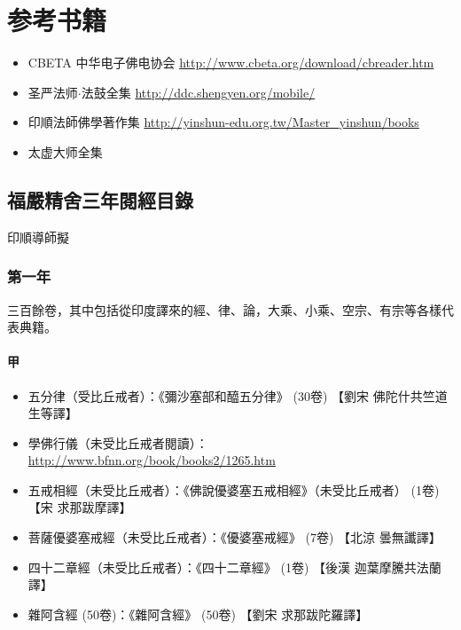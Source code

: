 \chapter{参考书籍}

\begin{itemize}
  \item CBETA 中华电子佛电协会 \url{http://www.cbeta.org/download/cbreader.htm}
  \item 圣严法师$\cdot$法鼓全集 \url{http://ddc.shengyen.org/mobile/}
  \item 印順法師佛學著作集 \url{http://yinshun-edu.org.tw/Master_yinshun/books}
  \item 太虚大师全集
\end{itemize}

\section{福嚴精舍三年閱經目錄}
印順導師擬
\subsection{第一年}
三百餘卷，其中包括從印度譯來的經、律、論，大乘、小乘、空宗、有宗等各樣代表典籍。
\subsubsection{甲}
\begin{itemize}
  \item 五分律（受比丘戒者）：《彌沙塞部和醯五分律》 (30卷) 【劉宋 佛陀什共竺道生等譯】
  \item 學佛行儀（未受比丘戒者閱讀）：\url{http://www.bfnn.org/book/books2/1265.htm}
  \item 五戒相經（未受比丘戒者）：《佛說優婆塞五戒相經》（未受比丘戒者） (1卷) 【宋 求那跋摩譯】
  \item 菩薩優婆塞戒經（未受比丘戒者）：《優婆塞戒經》 (7卷) 【北涼 曇無讖譯】
  \item 四十二章經（未受比丘戒者）：《四十二章經》 (1卷) 【後漢 迦葉摩騰共法蘭譯】
  \item 雜阿含經 (50卷)：《雜阿含經》 (50卷) 【劉宋 求那跋陀羅譯】
\end{itemize}
